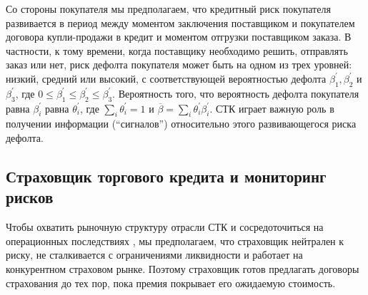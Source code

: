 \documentclass[a4paper,12pt]{article}
\begin{document}
Со стороны покупателя мы предполагаем, что кредитный риск покупателя развивается в период между моментом
заключения поставщиком и покупателем договора купли-продажи в кредит и моментом отгрузки поставщиком
заказа. В частности, к тому времени, когда поставщику необходимо решить, отправлять заказ или нет,
риск дефолта покупателя может быть на одном из трех уровней: низкий, средний или высокий, с соответствующей
вероятностью дефолта  $ \beta_{1}^{'}, \beta_{2}^{'}$ и $\beta_{3}^{'}$, где $0 \leq \beta_{1}^{'} \leq \beta_{2}^{'} \leq \beta_{3}^{'}$. Вероятность того, что вероятность дефолта покупателя равна $\beta_{i}^{'}$ равна $\theta_{i}^{'}$, где $\sum_{i}\theta_{i}^{'} = 1$ и $\overline{\beta} = \sum_{i}\theta_{i}^{'}\beta_{i}^{'}$. СТК играет важную
роль в получении информации (“сигналов”) относительно этого развивающегося риска дефолта.

\subsection{Страховщик торгового кредита и мониторинг рисков}

Чтобы охватить рыночную структуру отрасли СТК и сосредоточиться на операционных последствиях , мы предполагаем, что страховщик нейтрален к риску, не сталкивается с ограничениями ликвидности и работает на конкурентном страховом рынке. Поэтому страховщик готов предлагать договоры страхования до тех пор, пока премия покрывает его ожидаемую стоимость.
\end{document}
